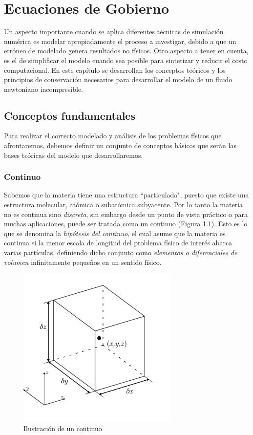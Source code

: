\documentclass[a4paper,10pt, oneside]{book}
\begin{document}
\chapter{Ecuaciones de Gobierno}

Un aspecto importante cuando se aplica diferentes técnicas de simulación numérica es modelar apropiadamente el proceso a investigar, debido a que un erróneo de modelado genera resultados no físicos. Otro aspecto a tener en cuenta, es el de simplificar el modelo cuando sea posible para sintetizar y reducir el costo computacional. En este capítulo se desarrollan los conceptos teóricos y los principios de conservación necesarios para desarrollar el modelo de un fluido newtoniano incompresible.

\section{Conceptos fundamentales}

Para realizar el correcto modelado y análisis de los problemas físicos que afrontaremos, debemos definir un conjunto de conceptos básicos que serán las bases teóricas del modelo que desarrollaremos.

\subsection{Continuo}

Sabemos que la materia tiene una estructura ``particulada", puesto que existe una estructura molecular, atómica o subatómica subyacente. Por lo tanto la materia no es continua sino \textit{discreta}, sin embargo desde un punto de vista práctico o para muchas aplicaciones, puede ser tratada como un continuo (Figura \ref{img:1-1}). Esto es lo que se denomina la \textit{hipótesis del continuo}, el cual asume que la materia es continua si la menor escala de longitud del problema físico de interés abarca varias partículas, definiendo dicho conjunto como \textit{elementos o diferenciales de volumen} infinitamente pequeños en un sentido físico. 
\begin{figure}[htb]
	\begin{center}
	\includegraphics[width=8cm]{Img/1-1}
	\caption{Ilustración de un continuo}
	\label{img:1-1}
	\end{center}
\end{figure}
\end{document}
